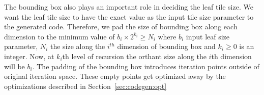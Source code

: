 The bounding box also plays an important role in deciding the leaf tile size.
We want the leaf tile size to have the exact value as the input tile size
parameter to the generated code. Therefore, we pad the size of bounding box
along each dimension to the minimum value of $b_i\times2^{k_i} \ge N_i$ where
$b_i$ input leaf size parameter, $N_i$ the size along the $i^{th}$ dimension
of bounding box and $k_i \ge 0$ is an integer. Now, at $k_i$th level of
recursion the orthant size along the $i$th dimension will be $b_i$. The
padding of the bounding box introduces iteration points outside of original
iteration space.  These empty points get optimized away by the optimizations
described in Section~\ref{sec:codegen:opt}


%
%
%
%
